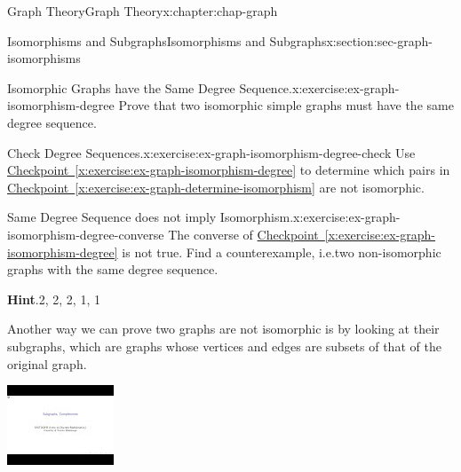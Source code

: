 \documentclass[oneside,10pt,]{book}
\newcommand{\blocktitlefont}{\relax}
\newcommand{\xreffont}{\relax}
\numberwithin{equation}{section}
\newlength{\qrsize}
\newlength{\previewwidth}
\begin{document}
\begin{chapterptx}{Graph Theory}{}{Graph Theory}{}{}{x:chapter:chap-graph}
\begin{sectionptx}{Isomorphisms and Subgraphs}{}{Isomorphisms and Subgraphs}{}{}{x:section:sec-graph-isomorphisms}
\begin{inlineexercise}{Isomorphic Graphs have the Same Degree Sequence.}{x:exercise:ex-graph-isomorphism-degree}
Prove that two isomorphic simple graphs must have the same degree sequence.%
\end{inlineexercise}%
\begin{inlineexercise}{Check Degree Sequences.}{x:exercise:ex-graph-isomorphism-degree-check}%
Use \hyperref[x:exercise:ex-graph-isomorphism-degree]{Checkpoint~{\xreffont\ref{x:exercise:ex-graph-isomorphism-degree}}} to determine which pairs in \hyperref[x:exercise:ex-graph-determine-isomorphism]{Checkpoint~{\xreffont\ref{x:exercise:ex-graph-determine-isomorphism}}} are not isomorphic.%
\end{inlineexercise}%
\begin{inlineexercise}{Same Degree Sequence does not imply Isomorphism.}{x:exercise:ex-graph-isomorphism-degree-converse}%
The converse of \hyperref[x:exercise:ex-graph-isomorphism-degree]{Checkpoint~{\xreffont\ref{x:exercise:ex-graph-isomorphism-degree}}} is not true. Find a counterexample, i.e.\@ two non-isomorphic graphs with the same degree sequence.%
\par\smallskip%
\noindent\textbf{\blocktitlefont Hint}.\hypertarget{g:hint:id545769}{}\quad{}2, 2, 2, 1, 1%
\end{inlineexercise}%
Another way we can prove two graphs are not isomorphic is by looking at their subgraphs, which are graphs whose vertices and edges are subsets of that of the original graph.%
\begin{sidebyside}{1}{0}{0}{0}%
\begin{sbspanel}{1}%
\setlength{\qrsize}{9em}
\setlength{\previewwidth}{\linewidth}
\addtolength{\previewwidth}{-\qrsize}
\begin{tcbraster}[raster columns=2, raster column skip=1pt, raster halign=center, raster force size=false, raster left skip=0pt, raster right skip=0pt]%
\begin{tcolorbox}[previewstyle, width=\previewwidth]%
\includegraphics[width=0.80\linewidth,height=\qrsize,keepaspectratio]{images/video-subgraphs.jpg}%

\end{tcolorbox}
\end{tcbraster}
\end{sbspanel}
\end{sidebyside}
\end{sectionptx}
\end{chapterptx}
\end{document}
